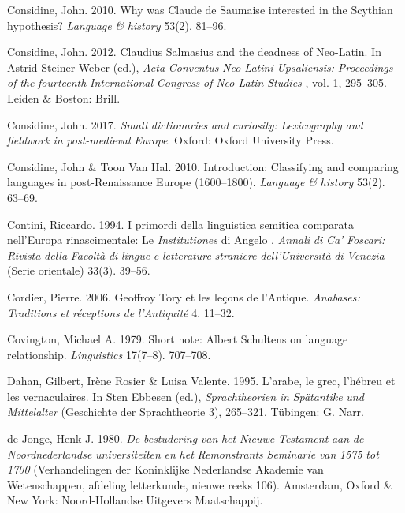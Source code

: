 Considine, John. 2010. Why was Claude de Saumaise interested in the Scythian hypothesis? \textit{Language} \textit{\&} \textit{history} 53(2). 81–96.

Considine, John. 2012. Claudius Salmasius and the deadness of Neo-Latin. In Astrid Steiner-Weber (ed.), \textit{Acta} \textit{Conventus} \textit{Neo-Latini} \textit{Upsaliensis:} \textit{Proceedings} \textit{of} \textit{the} \textit{fourteenth} \textit{International} \textit{Congress} \textit{of} \textit{Neo-Latin} \textit{Studies} \textit{\citep{Uppsala2009}}, vol. 1, 295–305. Leiden \& Boston: Brill.

Considine, John. 2017. \textit{Small} \textit{dictionaries} \textit{and} \textit{curiosity:} \textit{Lexicography} \textit{and} \textit{fieldwork} \textit{in} \textit{post-medieval} \textit{Europe}. Oxford: Oxford University Press.

Considine, John \& Toon Van Hal. 2010. Introduction: Classifying and comparing languages in post-Renaissance Europe (1600–1800). \textit{Language} \textit{\&} \textit{history} 53(2). 63–69.

Contini, Riccardo. 1994. I primordi della linguistica semitica comparata nell’Europa rinascimentale: Le \textit{Institutiones} di Angelo \citet{Canini1554}. \textit{Annali} \textit{di} \textit{Ca’} \textit{Foscari:} \textit{Rivista} \textit{della} \textit{Facoltà} \textit{di} \textit{lingue} \textit{e} \textit{letterature} \textit{straniere} \textit{dell’Università} \textit{di} \textit{Venezia} (Serie orientale) 33(3). 39–56.

Cordier, Pierre. 2006. Geoffroy Tory et les leçons de l’Antique. \textit{Anabases:} \textit{Traditions} \textit{et} \textit{réceptions} \textit{de} \textit{l’Antiquité} 4. 11–32.

Covington, Michael A. 1979. Short note: Albert Schultens on language relationship. \textit{Linguistics} 17(7–8). 707–708.

Dahan, Gilbert, Irène Rosier \& Luisa Valente. 1995. L’arabe, le grec, l’hébreu et les vernaculaires. In Sten Ebbesen (ed.), \textit{Sprachtheorien} \textit{in} \textit{Spätantike} \textit{und} \textit{Mittelalter} (Geschichte der Sprachtheorie 3), 265–321. Tübingen: G. Narr.

de Jonge, Henk J. 1980. \textit{De} \textit{bestudering} \textit{van} \textit{het} \textit{Nieuwe} \textit{Testament} \textit{aan} \textit{de} \textit{Noordnederlandse} \textit{universiteiten} \textit{en} \textit{het} \textit{Remonstrants} \textit{Seminarie} \textit{van} \textit{1575} \textit{tot} \textit{1700} (Verhandelingen der Koninklijke Nederlandse Akademie van Wetenschappen, afdeling letterkunde, nieuwe reeks 106). Amsterdam, Oxford \& New York: Noord-Hollandse Uitgevers Maatschappij.

